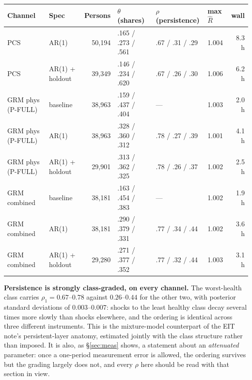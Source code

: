 \documentclass[11pt]{article}
\begin{document}
\begin{center}\small
\begin{tabular}{llrlllr}
\toprule
Channel & Spec & Persons & $\theta$ (shares) & $\rho$ (persistence) &
max $\hat R$ & wall \\
\midrule
PCS & AR(1) & 50{,}194 & .165 / .273 / .561 & .67 / .31 / .29 & 1.004 & 8.3 h \\
PCS & AR(1) + holdout & 39{,}349 & .146 / .234 / .620 & .67 / .26 / .30 & 1.006 & 6.2 h \\
GRM phys (P-FULL) & baseline & 38{,}963 & .159 / .437 / .404 & --- & 1.003 & 2.0 h \\
GRM phys (P-FULL) & AR(1) & 38{,}963 & .328 / .360 / .312 & .78 / .27 / .39 & 1.001 & 4.1 h \\
GRM phys (P-FULL) & AR(1) + holdout & 29{,}901 & .313 / .362 / .325 & .78 / .26 / .37 & 1.002 & 2.5 h \\
GRM combined & baseline & 38{,}181 & .163 / .454 / .383 & --- & 1.002 & 1.9 h \\
GRM combined & AR(1) & 38{,}181 & .290 / .379 / .331 & .77 / .34 / .44 & 1.002 & 3.6 h \\
GRM combined & AR(1) + holdout & 29{,}280 & .271 / .377 / .352 & .77 / .32 / .44 & 1.003 & 3.1 h \\
\bottomrule
\end{tabular}
\end{center}

\textbf{Persistence is strongly class-graded, on every channel.} The
worst-health class carries $\rho_1 = 0.67$--$0.78$ against $0.26$--$0.44$
for the other two, with posterior standard deviations of $0.003$--$0.007$:
shocks to the least healthy class decay several times more slowly than
shocks elsewhere, and the ordering is identical across three different
instruments. This is the mixture-model counterpart of the EIT note's
persistent-layer anatomy, estimated jointly with the class structure rather
than imposed. It is also, as \S\ref{sec:meas} shows, a statement about an
\emph{attenuated} parameter: once a one-period measurement error is allowed,
the ordering survives but the grading largely does not, and every $\rho$ here
should be read with that section in view.
\end{document}
